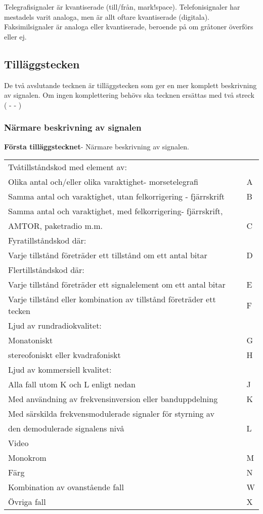 Telegrafisignaler är kvantiserade (till/från, mark!space).
Telefonisignaler har mestadels varit analoga, men är allt oftare
kvantiserade (digitala). Faksimilsignaler är analoga eller kvantiserade,
beroende på om gråtoner överförs eller ej.


\subsection{Tilläggstecken}
De två avslutande tecknen är tilläggstecken som ger en mer komplett
beskrivning av signalen. Om ingen komplettering behövs ska tecknen ersättas med
två streck ( - - )

\subsubsection{Närmare beskrivning av signalen}
\textbf{Första tilläggstecknet}- Närmare beskrivning av signalen.\\
\begin{tabular}{ll}
	Tvåtillståndskod med element av: &\\
	Olika antal och/eller olika varaktighet- morsetelegrafi & A\\
	Samma antal och varaktighet, utan felkorrigering - fjärrskrift & B\\
	Samma antal och varaktighet, med felkorrigering- fjärrskrift, &\\
	AMTOR, paketradio m.m. & C\\
	Fyratillståndskod där: &\\
	Varje tillstånd företräder ett tillstånd om ett antal bitar & D\\
	Flertillståndskod där: &\\
	Varje tillstånd företräder ett signalelement om ett antal bitar & E\\
	Varje tillstånd eller kombination av tillstånd företräder ett tecken & F\\
	Ljud av rundradiokvalitet: & \\
	Monatoniskt & G\\
	stereofoniskt eller kvadrafoniskt & H\\
	Ljud av kommersiell kvalitet: &\\
	Alla fall utom K och L enligt nedan & J\\
	Med användning av frekvensinversion eller banduppdelning & K\\
	Med särskilda frekvensmodulerade signaler för styrning av &\\
	den demodulerade signalens nivå & L\\
	Video &\\
	Monokrom & M\\
	Färg & N\\
	Kombination av ovanstående fall & W\\
	Övriga fall & X\\
\end{tabular}

